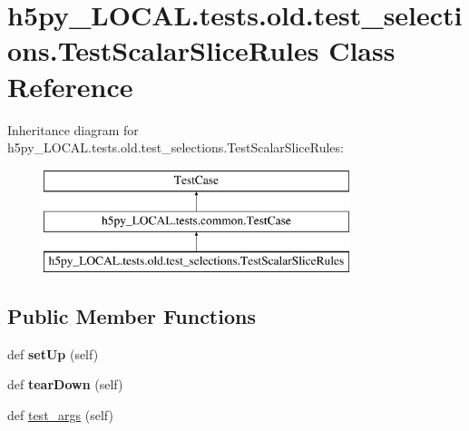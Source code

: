 \hypertarget{classh5py__LOCAL_1_1tests_1_1old_1_1test__selections_1_1TestScalarSliceRules}{}\section{h5py\+\_\+\+L\+O\+C\+A\+L.\+tests.\+old.\+test\+\_\+selections.\+Test\+Scalar\+Slice\+Rules Class Reference}
\label{classh5py__LOCAL_1_1tests_1_1old_1_1test__selections_1_1TestScalarSliceRules}
Inheritance diagram for h5py\+\_\+\+L\+O\+C\+A\+L.\+tests.\+old.\+test\+\_\+selections.\+Test\+Scalar\+Slice\+Rules\+:\begin{figure}[H]
\begin{center}
\leavevmode
\includegraphics[height=3.000000cm]{classh5py__LOCAL_1_1tests_1_1old_1_1test__selections_1_1TestScalarSliceRules}
\end{center}
\end{figure}
\subsection*{Public Member Functions}
\begin{DoxyCompactItemize}
\item 
\mbox{\label{classh5py__LOCAL_1_1tests_1_1old_1_1test__selections_1_1TestScalarSliceRules_a58161820af1abe2163978e2835f868c9}} 
def {\bfseries set\+Up} (self)
\item 
\mbox{\label{classh5py__LOCAL_1_1tests_1_1old_1_1test__selections_1_1TestScalarSliceRules_a83ee814c6ef833e6ce3663d99c127b91}} 
def {\bfseries tear\+Down} (self)
\item 
def \hyperlink{classh5py__LOCAL_1_1tests_1_1old_1_1test__selections_1_1TestScalarSliceRules_a4d2cd4a6982288c80a28d9888583e65c}{test\+\_\+args} (self)
\end{DoxyCompactItemize}

